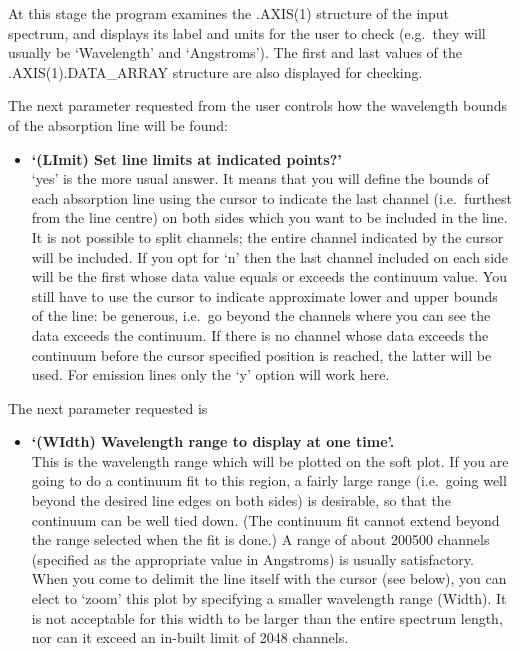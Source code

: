    At this stage the program examines the .AXIS(1) structure of the
   input spectrum, and displays its label and units for the user to
   check (e.g.\ they will usually be `Wavelength' and `Angstroms'). The
   first and last values of the .AXIS(1).DATA\_ARRAY structure are also
   displayed for checking.

   The next parameter requested from the user controls how the
   wavelength bounds of the absorption line will be found:

\begin{itemize}
\item{\bf `(LImit) Set line limits at indicated points?'}\ \\
   `yes' is the more usual answer.  It means that you will define the
   bounds of each absorption line using the cursor to indicate the last
   channel (i.e.\ furthest from the line centre) on both sides which you
   want to be included in the line. It is not possible to split
   channels; the entire channel indicated by the cursor will be
   included. If you opt for `n' then the last channel included on each
   side will be the first whose data value equals or exceeds the
   continuum value. You still have to use the cursor to indicate
   approximate lower and upper bounds of the line: be generous, i.e.\ go
   beyond the channels where you can see the data exceeds the continuum.
   If there is no channel whose data exceeds the continuum before the
   cursor specified position is reached, the latter will be used. For
   emission lines only the `y' option will work here.
\end{itemize}

   The next parameter requested is

\begin{itemize}
\item{\bf `(WIdth) Wavelength range to display at one time'.}\ \\
   This is the wavelength range which will be plotted on the soft plot.
   If you are going to do a continuum fit to this region, a fairly large
   range (i.e.\ going well beyond the desired line edges on both sides)
   is desirable, so that the continuum can be well tied down.  (The
   continuum fit cannot extend beyond the range selected when the fit is
   done.)  A range of about 200\latorhtm{--}{-}500 channels (specified as the
   appropriate value in Angstroms) is usually satisfactory.  When you
   come to delimit the line itself with the cursor (see below), you can
   elect to `zoom' this plot by specifying a smaller wavelength range
   (Width). It is not acceptable for this width to be larger than the
   entire spectrum length, nor can it exceed an in-built limit of 2048
   channels.
\end{itemize}

